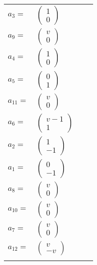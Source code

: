 \documentclass[1p]{elsarticle_modified}
\theoremstyle{definition}
\begin{document}
\begin{tabular}{m{7pt} m{180pt} m{7pt} m{180pt} }
\flushright $a_{3}=$&$\begin{pmatrix}1\\0\end{pmatrix}$ \\
\flushright $a_{9}=$&$\begin{pmatrix}v\\0\end{pmatrix}$ \\
\flushright $a_{4}=$&$\begin{pmatrix}1\\0\end{pmatrix}$ \\
\flushright $a_{5}=$&$\begin{pmatrix}0\\1\end{pmatrix}$ \\
\flushright $a_{11}=$&$\begin{pmatrix}v\\0\end{pmatrix}$ \\
\flushright $a_{6}=$&$\begin{pmatrix}v-1\\1\end{pmatrix}$ \\
\flushright $a_{2}=$&$\begin{pmatrix}1\\-1\end{pmatrix}$ \\
\flushright $a_{1}=$&$\begin{pmatrix}0\\-1\end{pmatrix}$ \\
\flushright $a_{8}=$&$\begin{pmatrix}v\\0\end{pmatrix}$ \\
\flushright $a_{10}=$&$\begin{pmatrix}v\\0\end{pmatrix}$ \\
\flushright $a_{7}=$&$\begin{pmatrix}v\\0\end{pmatrix}$ \\
\flushright $a_{12}=$&$\begin{pmatrix}v\\- v\end{pmatrix}$\\&\end{tabular}
\end{document}
